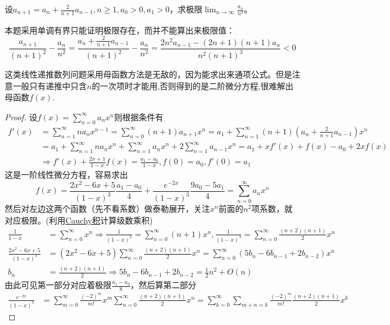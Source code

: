 \documentclass[../../main.tex]{subfiles}
\begin{document}
\begin{example}
设\(a_{n + 1}=a_n+\frac{2}{n + 1}a_{n - 1},n\geqslant 1,a_0>0,a_1>0\)，求极限\(\lim_{n\rightarrow\infty}\frac{a_n}{n^2}\)。
\end{example}
\begin{remark}
本题采用单调有界只能证明极限存在，而并不能算出来极限值：
\[
\frac{a_{n + 1}}{(n + 1)^2}-\frac{a_n}{n^2}=\frac{a_n+\frac{2}{n + 1}a_{n - 1}}{(n + 1)^2}-\frac{a_n}{n^2}=\frac{2n^2a_{n - 1}-(2n + 1)(n + 1)a_n}{n^2(n + 1)^3}<0
\]
\end{remark}
\begin{note}
这类线性递推数列问题采用母函数方法是无敌的，因为能求出来通项公式。但是注意一般只有递推中只含$n$的一次项时才能用,否则得到的是二阶微分方程,很难解出母函数$f(x)$.
\end{note}
\begin{proof}
设\(f(x)=\sum_{n = 0}^{\infty}a_nx^n\)则根据条件有
\begin{align*}
f'(x)&=\sum_{n = 1}^{\infty}na_nx^{n - 1}=\sum_{n = 0}^{\infty}(n + 1)a_{n + 1}x^n=a_1+\sum_{n = 1}^{\infty}(n + 1)\left(a_n+\frac{2}{n + 1}a_{n - 1}\right)x^n\\
&=a_1+\sum_{n = 1}^{\infty}na_nx^n+\sum_{n = 1}^{\infty}a_nx^n+2\sum_{n = 1}^{\infty}a_{n - 1}x^n=a_1+xf'(x)+f(x)-a_0+2xf(x)\\
&\Rightarrow f'(x)+\frac{2x + 1}{1 - x}f(x)=\frac{a_1 - a_0}{1 - x},f(0)=a_0,f'(0)=a_1
\end{align*}
这是一阶线性微分方程，容易求出
\[f(x)=\frac{2x^2 - 6x + 5}{(1 - x)^3}\frac{a_1 - a_0}{4}+\frac{e^{-2x}}{(1 - x)^3}\frac{9a_0 - 5a_1}{4}=\sum_{n = 0}^{\infty}a_nx^n\]
然后对左边这两个函数（先不看系数）做泰勒展开，关注\(x^n\)前面的\(n^2\)项系数，就对应极限。(利用\hyperref[corollary:收敛级数Cauchy积收敛则就等于级数积]{Cauchy积}计算级数乘积)
\begin{align*}
\frac{1}{1 - x}&=\sum_{n = 0}^{\infty}x^n\Rightarrow\frac{1}{(1 - x)^2}=\sum_{n = 0}^{\infty}(n + 1)x^n,\frac{1}{(1 - x)^3}=\sum_{n = 0}^{\infty}\frac{(n + 2)(n + 1)}{2}x^n\\
\frac{2x^2 - 6x + 5}{(1 - x)^3}&=(2x^2 - 6x + 5)\sum_{n = 0}^{\infty}\frac{(n + 2)(n + 1)}{2}x^n=\sum_{n = 0}^{\infty}(5b_n - 6b_{n - 1}+2b_{n - 2})x^n\\
b_n&=\frac{(n + 2)(n + 1)}{2}\Rightarrow 5b_n - 6b_{n - 1}+2b_{n - 2}=\frac{1}{2}n^2+O(n)
\end{align*}
由此可见第一部分对应着极限\(\frac{a_1 - a_0}{8}\)，然后算第二部分
\begin{align*}
\frac{e^{-2x}}{(1 - x)^3}&=\sum_{m = 0}^{\infty}\frac{(-2)^m}{m!}x^m\sum_{n = 0}^{\infty}\frac{(n + 2)(n + 1)}{2}x^n=\sum_{k = 0}^{\infty}\sum_{m + n = k}\frac{(-2)^m}{m!}\frac{(n + 2)(n + 1)}{2}x^k

\end{align*}
\end{proof}
\end{document}
